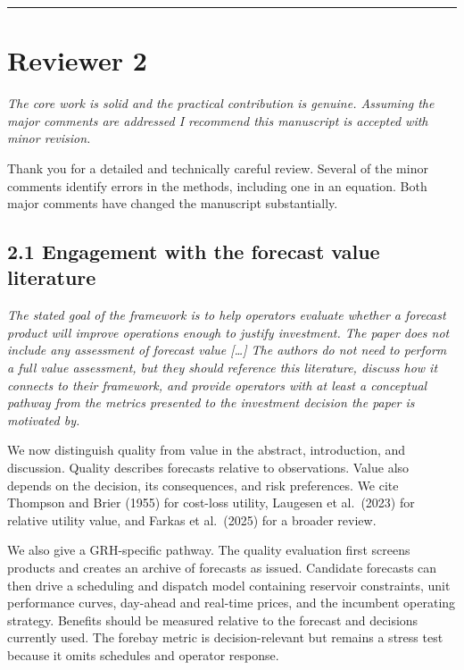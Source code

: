 \documentclass[11pt]{article}
\newenvironment{rc}%
  {\begin{list}{}{\setlength{\leftmargin}{1.5em}\setlength{\rightmargin}{1.5em}%
   \setlength{\topsep}{0.2em}\setlength{\parsep}{0pt}\setlength{\itemsep}{0pt}}%
   \item[]\itshape\color{quotegray}}%
  {\end{list}}
\begin{document}
\vspace{0.4em}
\hrule
\vspace{0.4em}

\section*{Reviewer 2}

\begin{rc}
The core work is solid and the practical contribution is genuine. Assuming the major
comments are addressed I recommend this manuscript is accepted with minor revision.
\end{rc}

Thank you for a detailed and technically careful review. Several of the minor comments
identify errors in the methods, including one in an equation. Both major comments
have changed the manuscript substantially.

\subsection*{2.1 Engagement with the forecast value literature}

\begin{rc}
The stated goal of the framework is to help operators evaluate whether a forecast
product will improve operations enough to justify investment. The paper does not
include any assessment of forecast value [\ldots] The authors do not need to perform a
full value assessment, but they should reference this literature, discuss how it
connects to their framework, and provide operators with at least a conceptual pathway
from the metrics presented to the investment decision the paper is motivated by.
\end{rc}

We now distinguish quality from value in the abstract, introduction, and discussion. Quality
describes forecasts relative to observations. Value also depends on the decision, its
consequences, and risk preferences. We cite Thompson and Brier (1955) for cost-loss utility,
Laugesen et al.\ (2023) for relative utility value, and Farkas et al.\ (2025) for a broader
review.

We also give a GRH-specific pathway. The quality evaluation first screens products and creates
an archive of forecasts as issued. Candidate forecasts can then drive a scheduling and dispatch
model containing reservoir constraints, unit performance curves, day-ahead and real-time
prices, and the incumbent operating strategy. Benefits should be measured relative to the
forecast and decisions currently used. The forebay metric is decision-relevant but remains a
stress test because it omits schedules and operator response.
\end{document}
